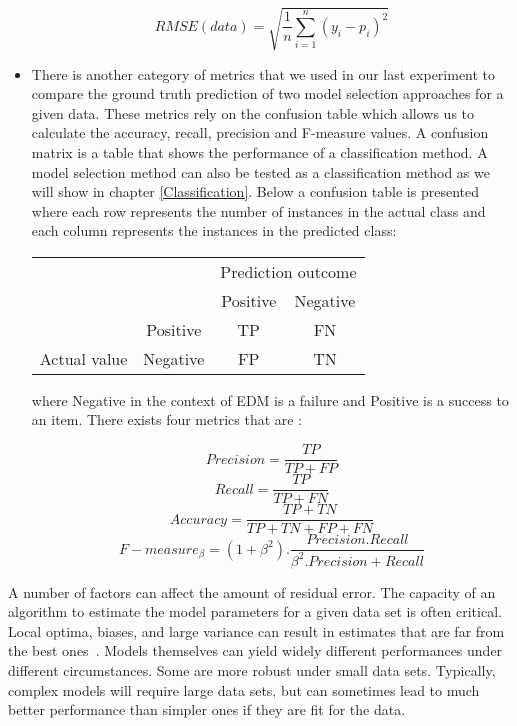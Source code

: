 \begin{itemize}
\begin{equation}
 RMSE(data) = \sqrt{\frac{1}{n}\sum_{i = 1}^{n}(y_i - p_i)^2}
\end{equation}

\item There is another category of metrics that we used in our last experiment to compare the ground truth prediction of two model selection approaches for a given data. These metrics rely on the confusion table which allows us to calculate the accuracy, recall, precision and F-measure values. A confusion matrix is a table that shows the performance of a classification method. A model selection method can also be tested as a classification method as we will show in chapter \ref{Classification}. Below a confusion table is presented where each row represents the number of instances in the actual class and each column represents the instances in the predicted class:


\begin{center}
\begin{tabular}{c|c|c|c|}
\multicolumn{2}{c}{}&\multicolumn{2}{c}{Prediction outcome}\tabularnewline
\cline{3-4}
\multicolumn{2}{c|}{}& \multicolumn{1}{c|}{Positive} & \multicolumn{1}{c|}{Negative} \tabularnewline
\cline{2-4}
&  \multicolumn{1}{c|}{Positive }&TP&FN\tabularnewline
\cline{2-4}
\multirow{-2}{*}{Actual value}& \multicolumn{1}{c|}{Negative} &FP&TN\tabularnewline
\cline{2-4}
\end{tabular}

\end{center}


\quad

where Negative in the context of EDM is a failure and Positive is a success to an item. There exists four metrics that are :

\begin{center}
\[Precision = \frac{TP}{TP+FP}\]
\[Recall = \frac{TP}{TP+FN}\]
\[Accuracy = \frac{TP+TN}{TP+TN+FP+FN}\]
\[F-measure_\beta = (1+\beta^2).\frac{Precision.Recall}{\beta^2.Precision+Recall}\]
\end{center}

\quad


\end{itemize}

A number of factors can affect the amount of residual error.  The capacity of an algorithm to estimate the model parameters for a given data set is often critical.  Local optima, biases, and large variance can result in estimates that are far from the best ones~\citep{hastie2005elements}.  Models themselves can yield widely different performances under different circumstances.  Some are more robust under small data sets.  Typically, complex models will require large data sets, but can sometimes lead to much better performance than simpler ones if they are fit for the data.

